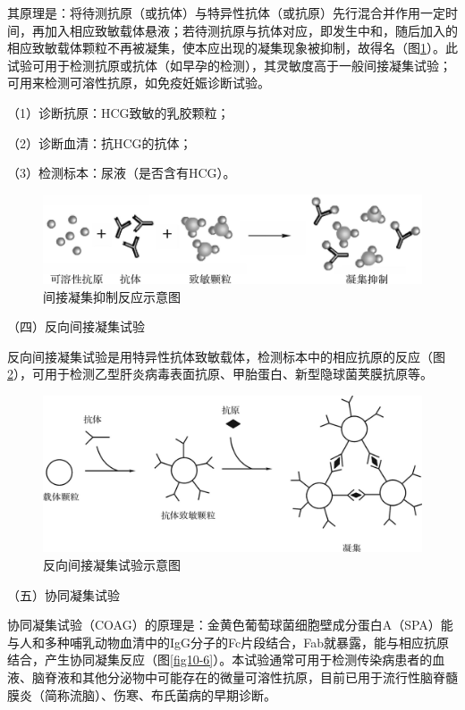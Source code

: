 其原理是：将待测抗原（或抗体）与特异性抗体（或抗原）先行混合并作用一定时间，再加入相应致敏载体悬液；若待测抗原与抗体对应，即发生中和，随后加入的相应致敏载体颗粒不再被凝集，使本应出现的凝集现象被抑制，故得名（图\ref{fig10-4}）。此试验可用于检测抗原或抗体（如早孕的检测），其灵敏度高于一般间接凝集试验；可用来检测可溶性抗原，如免疫妊娠诊断试验。

（1）诊断抗原：HCG致敏的乳胶颗粒；

（2）诊断血清：抗HCG的抗体；

（3）检测标本：尿液（是否含有HCG）。

\begin{figure}[!htbp]
 \centering
 \includegraphics{./images/Image00156.jpg}
 \captionsetup{justification=centering}
 \caption{间接凝集抑制反应示意图}
 \label{fig10-4}
  \end{figure} 

（四）反向间接凝集试验

反向间接凝集试验是用特异性抗体致敏载体，检测标本中的相应抗原的反应（图\ref{fig10-5}），可用于检测乙型肝炎病毒表面抗原、甲胎蛋白、新型隐球菌荚膜抗原等。

\begin{figure}[!htbp]
 \centering
 \includegraphics{./images/Image00157.jpg}
 \captionsetup{justification=centering}
 \caption{反向间接凝集试验示意图}
 \label{fig10-5}
  \end{figure} 

（五）协同凝集试验

协同凝集试验（COAG）的原理是：金黄色葡萄球菌细胞壁成分蛋白A（SPA）能与人和多种哺乳动物血清中的IgG分子的Fc片段结合，Fab就暴露，能与相应抗原结合，产生协同凝集反应（图\ref{fig10-6}）。本试验通常可用于检测传染病患者的血液、脑脊液和其他分泌物中可能存在的微量可溶性抗原，目前已用于流行性脑脊髓膜炎（简称流脑）、伤寒、布氏菌病的早期诊断。

